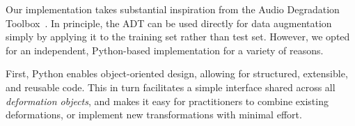 \documentclass{article}
\begin{document}
%
%
Our implementation takes substantial inspiration from the Audio Degradation
Toolbox~\cite{mauch2013audio}.  In principle, the ADT can be used directly
for data augmentation simply by applying it to the training set rather than test set.
However, we opted for an independent, Python-based implementation for a variety of reasons.

%
First, Python enables object-oriented design, allowing for structured,
extensible, and reusable code.  This in turn facilitates a simple interface shared across
all \emph{deformation objects}, and makes it easy for practitioners to combine existing
deformations, or implement new transformations with minimal effort.

%
\end{document}

